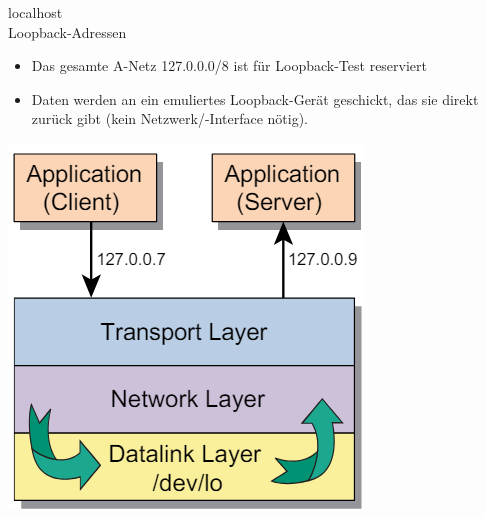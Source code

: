 \begin{definition}{localhost}\\
    Loopback-Adressen
    \begin{itemize}
        \item Das gesamte A-Netz 127.0.0.0/8 ist für Loopback-Test reserviert
        \item Daten werden an ein emuliertes Loopback-Gerät geschickt, das sie direkt zurück gibt (kein Netzwerk/-Interface nötig).
    \end{itemize}
    \includegraphics[width=0.5\linewidth]{images/localhost.png}
\end{definition}

